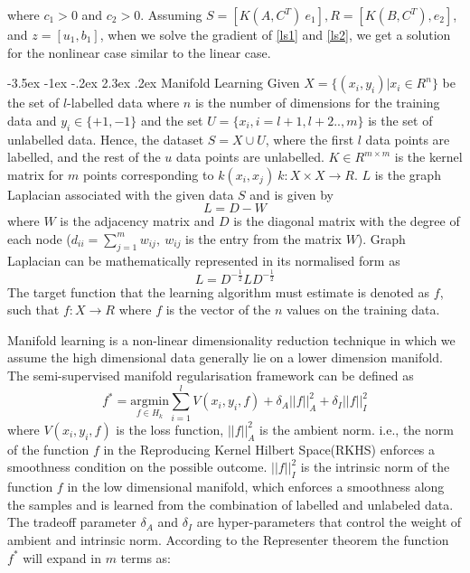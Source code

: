 \documentclass[12pt,a4paper,oneside,english]{report}
\makeatletter
\renewcommand\section{\@startsection {section}{1}{\z@}%
                                   {-3.5ex \@plus -1ex \@minus -.2ex}%
                                   {2.3ex \@plus.2ex}%
                                   {\centering\normalfont\LARGE\bfseries}}
\makeatother
\begin{document}
where \( c_1 > 0 \) and \( c_2 > 0 \). Assuming \( S = [K(A, C^T) \ e_1], R = [K(B, C^T), e_2] \), and \( z = [u_1, b_1] \), when we solve the gradient of \eqref{ls1} and \eqref{ls2}, we get a solution for the nonlinear case similar to the linear case.






\section{Manifold Learning}
Given \(X = \{(x_i,y_i) | x_i \in R^n\} \) be the set of $l$-labelled data where $n$ is the number of dimensions for the training data and \( y_i \in \{+1,-1\}\) and the set \(U = \{x_i, i =l+1,l+2..,m \}\) is the set of unlabelled data. Hence, the dataset \(S = X \cup U \), where the first \( l \) data points are labelled, and the rest of the \( u \) data points are unlabelled. \(K \in R^{ m \times m }\) is the kernel matrix for $m$ points corresponding to \(k(x_i,x_j)\   k:X\times X \rightarrow R\). $L$ is the graph Laplacian associated with the given data $S$ and is given by 
\begin{equation} \label{manifold_learning_1}
    L = D - W
\end{equation}
  where \(W\) is the adjacency matrix and \(D\) is the diagonal matrix with the degree of each node (\(d_{ii} = \sum_{j=1}^{m} w_{i j},\  w_{ij}\) is the entry from the matrix $W$). Graph Laplacian can be mathematically represented in its normalised form as 
  \begin{equation} \label{manifold_learning_2} 
     L = D^{-\frac{1}{2}}LD^{-\frac{1}{2}}
  \end{equation}
  The target function that the learning algorithm must estimate is denoted as \( f\), such that \(f:X \rightarrow R \) where \(f\) is the vector of the \(n\) values on the training data.%

Manifold learning\cite{belkin2006manifold} is a non-linear dimensionality reduction technique in which we assume the high dimensional data generally lie on a lower dimension manifold. The semi-supervised manifold regularisation framework can be defined as 
\begin{equation} \label{manifold_learning_3}
f^* = \underset {f \in H_k }{\mathrm{argmin}}\sum_{i=1}^{l} V(x_i,y_i,f) + \delta_A||f||^2_A + \delta_I||f||^2_I 
\end{equation}
where \(V(x_i,y_i,f)\) is the loss function, \(||f||^2_A\) is the ambient norm. i.e., the norm of the function \(f\) in the Reproducing Kernel Hilbert Space(RKHS) enforces a smoothness condition on the possible outcome. \(||f||^2_I\) is the intrinsic norm of the function \(f\) in the low dimensional manifold, which enforces a smoothness along the samples and is learned from the combination of labelled and unlabeled data. The tradeoff parameter $\delta_A$ and $\delta_I$ are hyper-parameters that control the weight of ambient and intrinsic norm. According to the Representer theorem \cite{melacci2011laplacian} the function \(f^*\) will expand in \(m\) terms as:
\end{document}
